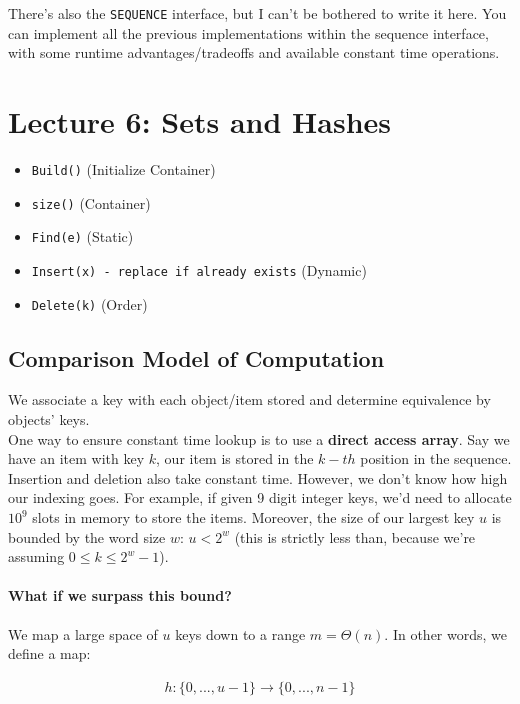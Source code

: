 \documentclass[11pt]{article}
\begin{document}
There's also the \texttt{SEQUENCE} interface, but I can't be bothered to write it here. You can
implement all the previous implementations within the sequence interface, with some
runtime advantages/tradeoffs and available constant time operations.


\section{Lecture 6: Sets and Hashes}
\begin{itemize}
    \item \texttt{Build()} (Initialize Container)
    \item \texttt{size()} (Container)
    \item \texttt{Find(e)} (Static)
    \item \texttt{Insert(x) - replace if already exists} (Dynamic)
    \item \texttt{Delete(k)} (Order)
\end{itemize}

\subsection{Comparison Model of Computation}
We associate a key with each object/item stored and determine equivalence by objects' keys. \\
One way to ensure constant time lookup is to use a \textbf{direct access array}. Say we have an 
item with key $k$, our item is stored in the $k-th$ position in the sequence. Insertion and deletion
also take constant time. However, we don't know how high our indexing goes. For example, if given 
9 digit integer keys, we'd need to allocate \textbf{$10^9$} slots in memory to store the items. 
Moreover, the size of our largest key $u$ is bounded by the word size $w$: $u < 2^w$ (this is 
strictly less than, because we're assuming $0 \leq k \leq 2^w-1$).

\paragraph{What if we surpass this bound?} We map a large space of $u$ keys down to a range 
$m=\Theta(n)$. In other words, we define a map:

\begin{align*}
    h: \{0,...,u-1\} \rightarrow \{0,...,n-1\}
\end{align*}
\end{document}
